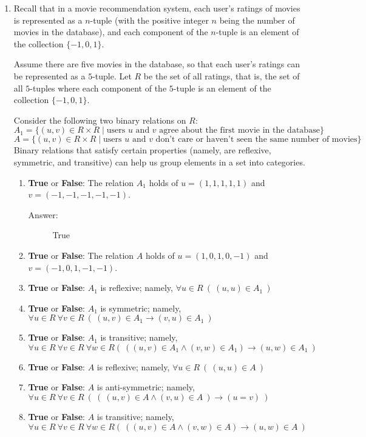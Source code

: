 \documentclass[12pt, oneside]{article}
\begin{document}
\begin{enumerate}
\item Recall that 
in a movie recommendation system, each 
user's ratings of movies is represented as a $n$-tuple (with the positive integer $n$  being the number of movies in the database), and each  component of 
the $n$-tuple is an element of  the collection $\{-1,0,1\}$.

Assume there are five movies in the database, so that   each user's ratings
can be represented as a $5$-tuple. Let $R$ be the set of all ratings, that  is, the  set of all $5$-tuples where each  component of the $5$-tuple is an element of  the collection $\{-1,0,1\}$.

Consider the following two binary relations on $R$:
\[
A_1 =  \{  (u,v) \in R \times R \mid 
\text{users $u$  and  $v$  agree about the first 
movie in the database} \}
\]
\[
A =  \{  (u,v) \in R \times R \mid 
\text{users $u$  and  $v$  don't care or haven't seen the same number of movies} \}
\]
Binary  relations that satisfy certain 
properties (namely,  are  reflexive, symmetric,
and transitive)  can help us group 
elements in a set into categories. 


\begin{enumerate}
    \item {\bf True} or {\bf False}: 
    The  relation $A_1$ holds of  $u=(1,1,1,1,1)$ and
    $v=(-1,-1,-1,-1,-1)$.
    \begin{description}
        \item[Answer:] True
    \end{description}
    \item {\bf True} or {\bf False}: 
    The  relation $A$ holds of  $u=(1,0,1,0,-1)$ and
    $v=(-1,0,1,-1,-1)$.
    \item {\bf True} or {\bf False}: $A_1$ is reflexive; namely, 
    $\forall u  \in R ~(~(u,u) \in A_1~)$
    \item {\bf True} or {\bf False}:  $A_1$ is symmetric; namely, 
    $\forall u \in  R~\forall  v \in R ~(~(u,v) \in A_1 \to  (v,u) \in A_1~)$
    \item {\bf True} or {\bf False}:  $A_1$ is transitive; namely, 
    $\forall u \in  R~\forall  v \in R ~\forall w \in  R (~\left( (u,v) \in A_1 \wedge (v,w)\in A_1\right) \to  (u,w) \in A_1~)$
    \item {\bf True} or {\bf False}:  $A$ is reflexive; namely, 
    $\forall u  \in R ~(~(u,u) \in A~)$
    \item {\bf True} or {\bf False}:  $A$ is anti-symmetric; namely, 
    $\forall u \in  R~\forall  v \in R ~(~(~(u,v) \in A \land  (v,u) \in A~) \to (u = v)~)$
    \item {\bf True} or {\bf False}:  $A$ is transitive; namely, 
    $\forall u \in  R~\forall  v \in R ~\forall w \in  R (~\left( (u,v) \in A \wedge (v,w)\in A\right) \to  (u,w) \in A~)$
\end{enumerate}


\end{enumerate}
\end{document}
